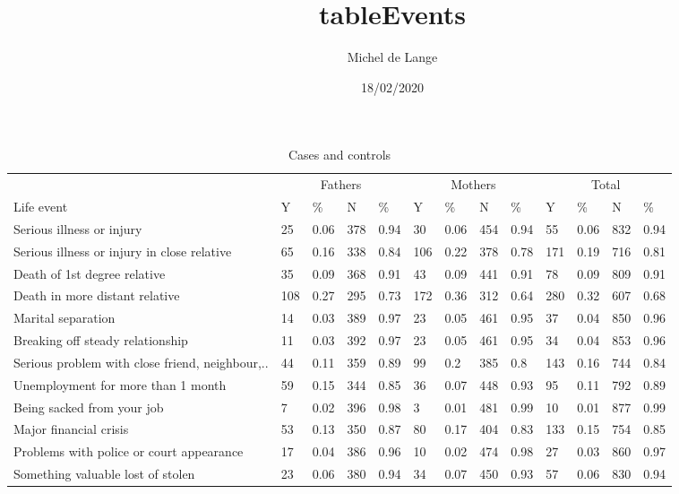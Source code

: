 \documentclass[]{article}
\title{tableEvents}
\author{Michel de Lange}
\date{18/02/2020}
\begin{document}
\maketitle

\begin{table}[t]

\caption{\label{tab:unnamed-chunk-1}Cases and controls}
\begin{tabular}{l|l|l|l|l|l|l|l|l|l|l|l|l}
\hline
\multicolumn{1}{c|}{ } & \multicolumn{4}{c|}{Fathers} & \multicolumn{4}{c|}{Mothers} & \multicolumn{4}{c}{Total} \\
\cline{2-5} \cline{6-9} \cline{10-13}
Life event & Y & \% & N & \% & Y & \% & N & \% & Y & \% & N & \%\\
\hline
Serious illness or injury & 25 & 0.06 & 378 & 0.94 & 30 & 0.06 & 454 & 0.94 & 55 & 0.06 & 832 & 0.94\\
\hline
Serious illness or injury in close relative & 65 & 0.16 & 338 & 0.84 & 106 & 0.22 & 378 & 0.78 & 171 & 0.19 & 716 & 0.81\\
\hline
Death of 1st degree relative & 35 & 0.09 & 368 & 0.91 & 43 & 0.09 & 441 & 0.91 & 78 & 0.09 & 809 & 0.91\\
\hline
Death in more distant relative & 108 & 0.27 & 295 & 0.73 & 172 & 0.36 & 312 & 0.64 & 280 & 0.32 & 607 & 0.68\\
\hline
Marital separation & 14 & 0.03 & 389 & 0.97 & 23 & 0.05 & 461 & 0.95 & 37 & 0.04 & 850 & 0.96\\
\hline
Breaking off steady relationship & 11 & 0.03 & 392 & 0.97 & 23 & 0.05 & 461 & 0.95 & 34 & 0.04 & 853 & 0.96\\
\hline
Serious problem with close friend, neighbour,.. & 44 & 0.11 & 359 & 0.89 & 99 & 0.2 & 385 & 0.8 & 143 & 0.16 & 744 & 0.84\\
\hline
Unemployment for more than 1 month & 59 & 0.15 & 344 & 0.85 & 36 & 0.07 & 448 & 0.93 & 95 & 0.11 & 792 & 0.89\\
\hline
Being sacked from your job & 7 & 0.02 & 396 & 0.98 & 3 & 0.01 & 481 & 0.99 & 10 & 0.01 & 877 & 0.99\\
\hline
Major financial crisis & 53 & 0.13 & 350 & 0.87 & 80 & 0.17 & 404 & 0.83 & 133 & 0.15 & 754 & 0.85\\
\hline
Problems with police or court appearance & 17 & 0.04 & 386 & 0.96 & 10 & 0.02 & 474 & 0.98 & 27 & 0.03 & 860 & 0.97\\
\hline
Something valuable lost of stolen & 23 & 0.06 & 380 & 0.94 & 34 & 0.07 & 450 & 0.93 & 57 & 0.06 & 830 & 0.94\\

\end{tabular}
\end{table}
\end{document}
